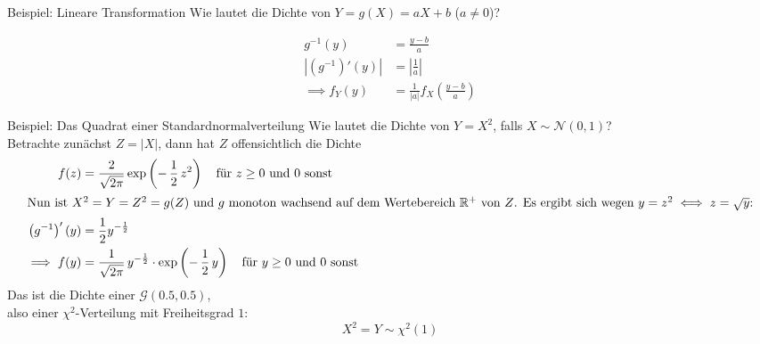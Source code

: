 \documentclass[
  10pt,
  ignorenonframetext,
]{beamer}
\begin{document}
\begin{frame}{Beispiel: Lineare Transformation}
\label{beispiel-lineare-transformation}
Wie lautet die Dichte von \(Y = g(X) = aX + b\) (\(a \neq 0\))?

\begin{align*}
g^{-1}(y) &= \tfrac{y-b}{a} \\
\left|\left(g^{-1}\right)'(y)\right| &= \left|\tfrac{1}{a}\right| \\
\implies f_Y(y) & =  \tfrac{1}{|a|} f_X\left(\tfrac{y-b}{a}\right)
\end{align*}
\end{frame}

\begin{frame}{Beispiel: Das Quadrat einer Standardnormalverteilung}
\label{beispiel-das-quadrat-einer-standardnormalverteilung}
Wie lautet die Dichte von \(Y = X^2\), falls
\(X \sim {\mathcal N}(0,1)\)?\\
Betrachte zunächst \(Z = |X|\), dann hat \(Z\) offensichtlich die Dichte
\begin{align*}
f(z) &= \frac{2}{\sqrt{2 \pi}} \exp\left(- \, \frac{1}{2}\, z^2\right)
\quad \mbox{für $z \geq 0$ und $0$ sonst}\\
\intertext{Nun ist $X^2 = Y = Z^2 = g(Z)$ und $g$ monoton wachsend auf dem Wertebereich
$\mathbb{R}^+$ von $Z$. Es ergibt sich wegen $y = z^2 \iff z = \sqrt{y}$:}
\left(g^{-1}\right)'(y) &=  \frac{1}{2} y^{-\frac{1}{2}} \\
\implies f(y) & =  \frac{1}{\sqrt{2 \pi}}\, y^{-\frac{1}{2}}  \cdot \exp\left(- \, \frac{1}{2}\, y\right) \quad \mbox{für $y \geq 0$ und $0$ sonst}
\end{align*} Das ist die Dichte einer \({\mathcal G}(0.5, 0.5)\),\\
also einer \(\chi^2\)-Verteilung mit Freiheitsgrad \(1\):\\
\[X^2 = Y \sim \chi^2(1)\]
\end{frame}
\end{document}
